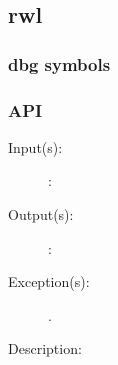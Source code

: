 %
%
%
%
%              

\label{rwl}
\subsection{rwl}

\subsubsection{dbg symbols}

\subsubsection{API}
\begin{description}
\label{rwl_}
\item[{\cfunc[]{rwl\_}{}}: ]
	\begin{description}\item[]
	\item[Input(s): ]
		\begin{description}\item[]
		\item[: ]
		\end{description}
	\item[Output(s): ]
		\begin{description}\item[]
		\item[: ]
		\end{description}
	\item[Exception(s): ]
		\begin{description}\item[]
		\item[.]
		\end{description}
	\item[Description: ]
	\end{description}
\end{description}
